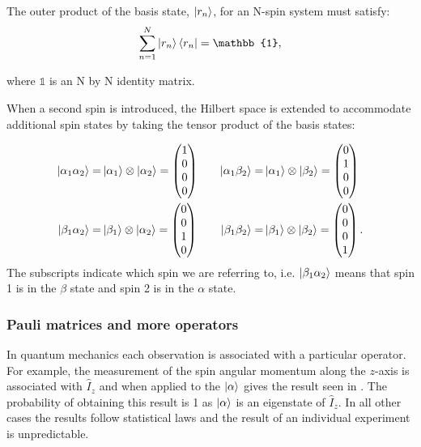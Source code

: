 The outer product of the basis state, $\ket{r_n}$, for an N-spin system must satisfy:
\begin{equation}
  \sum_{n=1}^{N} \ket{r_n}\bra{r_n} = \mathbb{1},
\end{equation}

where $\mathbb{1}$ is an N by N identity matrix.

When a second spin is introduced, the Hilbert space is extended to accommodate additional spin
states by taking the tensor product of the basis states:

\begin{align}\label{eqn:2spinstates}
\ket{\alpha_{1}\alpha_{2}} =& \ket{\alpha_1} \otimes \ket{\alpha_2} = \begin{pmatrix}
  1\\
  0\\
  0\\
  0
\end{pmatrix} &\quad
\ket{\alpha_{1}\beta_{2}} =& \ket{\alpha_1} \otimes \ket{\beta_2} = \begin{pmatrix}
  0\\
  1\\
  0\\
  0
\end{pmatrix}\\
\ket{\beta_{1}\alpha_{2}} =& \ket{\beta_1} \otimes \ket{\alpha_2} = \begin{pmatrix}
  0\\
  0\\
  1\\
  0
\end{pmatrix} &\quad
\ket{\beta_{1}\beta_{2}} =& \ket{\beta_1} \otimes \ket{\beta_2} = \begin{pmatrix}
  0\\
  0\\
  0\\
  1
\end{pmatrix}.
\end{align}
The subscripts indicate which spin we are referring to, i.e. $\ket{\beta_1\alpha_2}$ means that
spin 1 is in the $\beta$ state and spin 2 is in the $\alpha$ state.

\subsubsection{Pauli matrices and more operators}

In quantum mechanics each observation is associated with a particular operator. For
example, the measurement of the spin angular momentum along the $z$-axis is associated with
$\hat{I}_z$ and when applied to the $\ket{\alpha}$ gives the result seen in . The
probability of obtaining this result is 1 as $\ket{\alpha}$ is an eigenstate of $\hat{I}_z$. In
all other cases the results follow statistical laws and the result of an individual experiment
is unpredictable.

